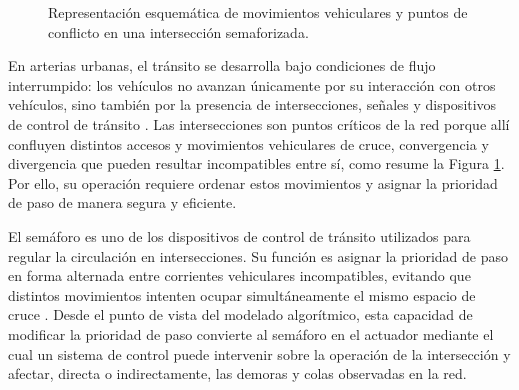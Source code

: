 \begin{figure}[htp]
    \centering
    \caption{Representación esquemática de movimientos vehiculares y puntos de conflicto en una intersección semaforizada.}
    \label{fig:conflictos_interseccion}
\end{figure}

En arterias urbanas, el tránsito se desarrolla bajo condiciones de flujo interrumpido: los vehículos no avanzan únicamente por su interacción con otros vehículos, sino también por la presencia de intersecciones, señales y dispositivos de control de tránsito \cite{ite_handbook}. Las intersecciones son puntos críticos de la red porque allí confluyen distintos accesos y movimientos vehiculares de cruce, convergencia y divergencia que pueden resultar incompatibles entre sí, como resume la Figura \ref{fig:conflictos_interseccion}. Por ello, su operación requiere ordenar estos movimientos y asignar la prioridad de paso de manera segura y eficiente.

El semáforo es uno de los dispositivos de control de tránsito utilizados para regular la circulación en intersecciones. Su función es asignar la prioridad de paso en forma alternada entre corrientes vehiculares incompatibles, evitando que distintos movimientos intenten ocupar simultáneamente el mismo espacio de cruce \cite{fernandez}. Desde el punto de vista del modelado algorítmico, esta capacidad de modificar la prioridad de paso convierte al semáforo en el actuador mediante el cual un sistema de control puede intervenir sobre la operación de la intersección y afectar, directa o indirectamente, las demoras y colas observadas en la red.

